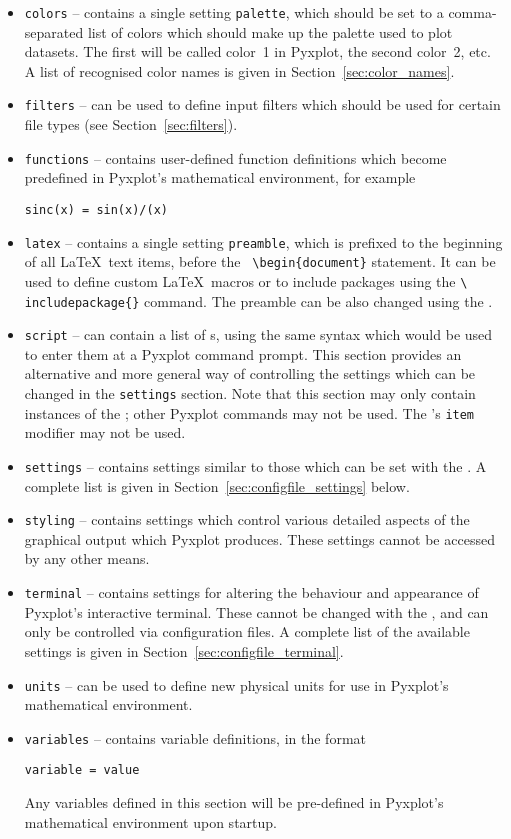 \begin{itemize}
\item {\tt colors} -- contains a single setting {\tt palette}, which should be
set to a comma-separated list of colors which should make up the palette used
to plot datasets. The first will be called color~1 in Pyxplot, the second
color~2, etc. A list of recognised color names is given in
Section~\ref{sec:color_names}.
\item {\tt filters} -- can be used to define input filters which should be used
for certain file types (see Section~\ref{sec:filters}).
\item {\tt functions} -- contains user-defined function definitions which
become predefined in Pyxplot's mathematical environment, for example
\begin{verbatim}
sinc(x) = sin(x)/(x)
\end{verbatim}
\item {\tt latex} -- contains a single setting {\tt preamble}, which is
prefixed to the beginning of all \LaTeX\ text items, before the {\tt
\textbackslash begin\{document\}} statement. It can be used to define custom
\LaTeX\ macros or to include packages using the {\tt \textbackslash
includepackage\{\}} command.  The preamble can be also changed using the
.
\item {\tt script} -- can contain a list of s, using the same
syntax which would be used to enter them at a Pyxplot command prompt. This
section provides an alternative and more general way of controlling the
settings which can be changed in the {\tt settings} section. Note that this
section may only contain instances of the ; other Pyxplot
commands may not be used. The 's {\tt item} modifier may not be
used.
\item {\tt settings} -- contains settings similar to those which can be set
with the . A complete list is given in
Section~\ref{sec:configfile_settings} below.
\item {\tt styling} -- contains settings which control various detailed aspects
of the graphical output which Pyxplot produces. These settings cannot be
accessed by any other means.
\item {\tt terminal} -- contains settings for altering the behaviour and
appearance of Pyxplot's interactive terminal. These cannot be changed with the
, and can only be controlled via configuration files. A complete
list of the available settings is given in
Section~\ref{sec:configfile_terminal}.
\item {\tt units} -- can be used to define new physical units for use in
Pyxplot's mathematical environment.
\item {\tt variables} -- contains variable definitions, in the format
\begin{verbatim}
variable = value
\end{verbatim}
Any variables defined in this section will be pre-defined in Pyxplot's
mathematical environment upon startup.

\end{itemize}

